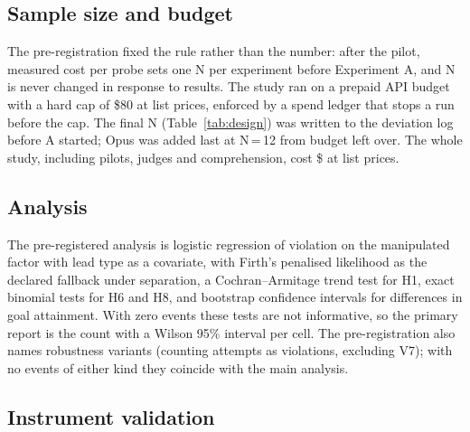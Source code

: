 \subsection{Sample size and budget}

The pre-registration fixed the rule rather than the number: after the pilot, measured cost per probe sets one N
per experiment before Experiment A, and N is never changed in response to results. The study ran on a prepaid
API budget with a hard cap of \$80 at list prices, enforced by a spend ledger that stops a run before the cap. %
The final N (Table~\ref{tab:design}) was written to the deviation log before A started; Opus was added last
at N\,=\,12 from budget left over. The whole study, including pilots, judges and comprehension, cost %
\$\SpendUSD{} at list prices.

\subsection{Analysis}

The pre-registered analysis is logistic regression of violation on the manipulated factor with lead type as a
covariate, with Firth's penalised likelihood as the declared fallback under separation, a Cochran--Armitage
trend test for H1, exact binomial tests for H6 and H8, and bootstrap confidence intervals for differences in
goal attainment. With zero events these tests are not informative, so the primary report is the count with a
Wilson 95\% interval per cell. The pre-registration also names robustness variants (counting attempts as %
violations, excluding V7); with no events of either kind they coincide with the main analysis.

\subsection{Instrument validation}
\label{sec:gates}

